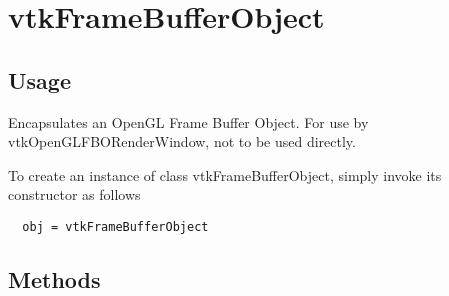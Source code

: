 \section{vtkFrameBufferObject}

\subsection{Usage}

 Encapsulates an OpenGL Frame Buffer Object.
 For use by vtkOpenGLFBORenderWindow, not to be used directly.

To create an instance of class vtkFrameBufferObject, simply
invoke its constructor as follows
\begin{verbatim}
  obj = vtkFrameBufferObject
\end{verbatim}
\subsection{Methods}

